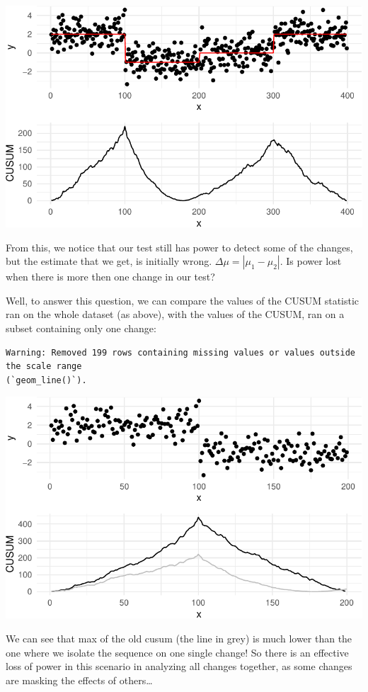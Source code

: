 \documentclass[
  letterpaper,
  DIV=11,
  numbers=noendperiod]{scrreprt}
\begin{document}
\includegraphics{3_multiple_changes_files/figure-pdf/unnamed-chunk-3-1.pdf}

From this, we notice that our test still has power to detect some of the
changes, but the estimate that we get, is initially wrong.
\(\Delta \mu = |\mu_1 - \mu_2|\). Is power lost when there is more then
one change in our test?

Well, to answer this question, we can compare the values of the CUSUM
statistic ran on the whole dataset (as above), with the values of the
CUSUM, ran on a subset containing only one change:

\begin{verbatim}
Warning: Removed 199 rows containing missing values or values outside the scale range
(`geom_line()`).
\end{verbatim}

\includegraphics{3_multiple_changes_files/figure-pdf/unnamed-chunk-4-1.pdf}

We can see that max of the old cusum (the line in grey) is much lower
than the one where we isolate the sequence on one single change! So
there is an effective loss of power in this scenario in analyzing all
changes together, as some changes are masking the effects of
others\ldots{}
\end{document}
